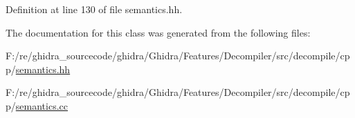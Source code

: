 Definition at line 130 of file semantics.\+hh.



The documentation for this class was generated from the following files\+:\begin{DoxyCompactItemize}
\item 
F\+:/re/ghidra\+\_\+sourcecode/ghidra/\+Ghidra/\+Features/\+Decompiler/src/decompile/cpp/\mbox{\hyperlink{semantics_8hh}{semantics.\+hh}}\item 
F\+:/re/ghidra\+\_\+sourcecode/ghidra/\+Ghidra/\+Features/\+Decompiler/src/decompile/cpp/\mbox{\hyperlink{semantics_8cc}{semantics.\+cc}}\end{DoxyCompactItemize}
